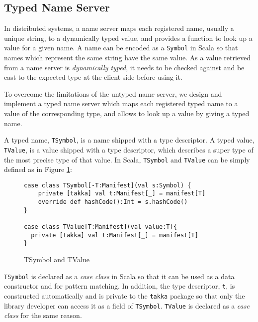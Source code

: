 \subsection{Typed Name Server}
\label{nameserver}

In distributed systems, a name server maps each registered name, usually a
unique string, to a dynamically typed value, and provides a function to look up 
a value for a
given name. A name can be encoded as a {\tt Symbol} in Scala so that names
which represent the same string have the same value.  As a value retrieved from 
a name server is {\it dynamically typed}, it needs to be checked against and be 
cast to the expected type at the client side before using it.

To overcome the limitations of the untyped name server, we design and implement
a typed name server which maps each registered typed name to a value of the
corresponding type, and allows to look up a value by giving a typed name.

A typed name, {\tt TSymbol}, is a name shipped with a type descriptor.  A 
typed value, {\tt TValue}, is a value shipped with a type descriptor, which
describes a super type of the most precise type of that value.  
In Scala, {\tt TSymbol} and {\tt TValue} can be simply defined as in Figure
\ref{tsymbol}:

\begin{figure}[h]
\label{tsymbol}
\begin{lstlisting}
case class TSymbol[-T:Manifest](val s:Symbol) {
    private [takka] val t:Manifest[_] = manifest[T]
    override def hashCode():Int = s.hashCode()  
}

case class TValue[T:Manifest](val value:T){
  private [takka] val t:Manifest[_] = manifest[T]
}
\end{lstlisting}
\caption{TSymbol and TValue}
\end{figure}

{\tt TSymbol} is declared as a {\it case class} in Scala so that it can be 
used as a data constructor and for pattern matching.  In addition, the
type descriptor, {\tt t}, is constructed automatically and is private to the
{\tt takka} package so that only the library developer can access it as a field  
of {\tt TSymbol}. {\tt TValue} is declared as a {\it case class} for the same 
reason.

